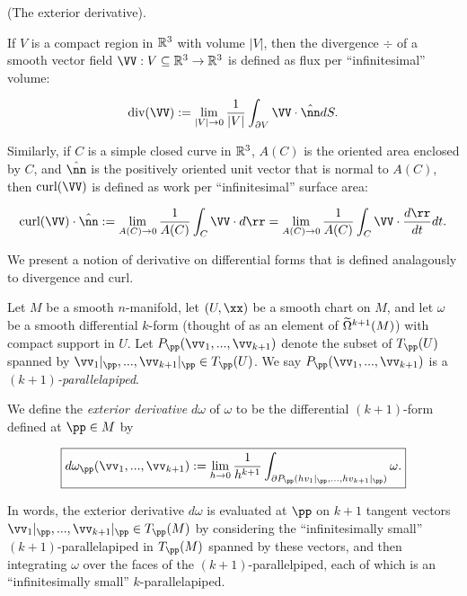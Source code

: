 \begin{defn}
\label{ch::diff_forms::defn::exterior_derivative}
     (The exterior derivative). 
    
    If $V$ is a compact region in $\mathbb{R}^3$ with volume $|V|$, then the divergence $\div$ of a smooth vector field $\VV:V \subseteq \R^3 \rightarrow \R^3$ is defined as flux per ``infinitesimal'' volume:
    
    \begin{align*}
        \div(\VV) :=  \lim_{|V| \rightarrow 0} \frac{1}{|V|} \int_{\pd V} \VV \cdot \hat{\nn} dS.
    \end{align*}
    
    Similarly, if $C$ is a simple closed curve in $\mathbb{R}^3$, $A(C)$ is the oriented area enclosed by $C$, and $\hat{\nn}$ is the positively oriented unit vector that is normal to $A(C)$, then $\curl(\VV)$ is defined as work per ``infinitesimal'' surface area:
    
    \begin{align*}
        \curl(\VV) \cdot \hat{\nn} := \lim_{A(C) \rightarrow 0} \frac{1}{A(C)} \int_C \VV \cdot d\rr = \lim_{A(C) \rightarrow 0} \frac{1}{A(C)} \int_C \VV \cdot \frac{d\rr}{dt} dt.
    \end{align*}
    
    We present a notion of derivative on differential forms that is defined analagously to divergence and curl.
    
    Let $M$ be a smooth $n$-manifold, let $(U, \xx)$ be a smooth chart on $M$, and let $\omega$ be a smooth differential $k$-form (thought of as an element of $\widetilde{\Omega}^{k + 1}(M)$) with compact support in $U$. Let $P_\pp(\vv_1, ..., \vv_{k + 1})$ denote the subset of $T_\pp(U)$ spanned by $\vv_1|_\pp, ..., \vv_{k + 1}|_\pp \in T_\pp(U)$. We say $P_\pp(\vv_1, ..., \vv_{k + 1})$ is a \textit{$(k + 1)$-parallelapiped}.
    
    We define the \textit{exterior derivative} $d\omega$ of $\omega$ to be the differential $(k + 1)$-form defined at $\pp \in M$ by
    
    \begin{align*}
        \boxed
        {
            d\omega_\pp(\vv_1, ..., \vv_{k + 1}) := \lim_{h \rightarrow 0} \frac{1}{h^{k + 1}} \int_{\pd P_\pp(h v_1|_\pp, ..., h v_{k + 1}|_\pp)} \omega.
        }
    \end{align*}
    
    In words, the exterior derivative $d \omega$ is evaluated at $\pp$ on $k + 1$ tangent vectors $\vv_1|_\pp, ..., \vv_{k + 1}|_\pp \in T_\pp(M)$ by considering the ``infinitesimally small'' $(k + 1)$-parallelapiped in $T_\pp(M)$ spanned by these vectors, and then integrating $\omega$ over the faces of the $(k + 1)$-parallelpiped, each of which is an ``infinitesimally small'' $k$-parallelapiped.
    

\end{defn}
